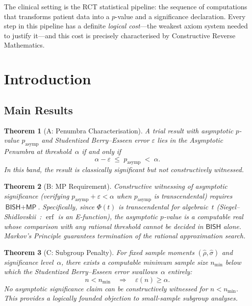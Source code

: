 \documentclass[11pt,a4paper]{article}
\theoremstyle{plain}
\newtheorem{theorem}{Theorem}[section]
\theoremstyle{definition}
\newcommand{\BISH}{\textsf{BISH}}
\newcommand{\MP}{\textsf{MP}}
\renewcommand{\Phi}{\varPhi}
\begin{document}
The clinical setting is the RCT statistical pipeline: the sequence of computations that transforms patient data into a $p$-value and a significance declaration.  Every step in this pipeline has a definite \emph{logical cost}---the weakest axiom system needed to justify it---and this cost is precisely characterised by Constructive Reverse Mathematics.

\section{Introduction}\label{sec:intro}

\subsection{Main Results}

\begin{theorem}[A: Penumbra Characterisation]\label{thm:A}
A trial result with asymptotic $p$-value $p_{\mathrm{asymp}}$ and Studentized Berry--Esseen error $\varepsilon$ lies in the \emph{Asymptotic Penumbra} at threshold~$\alpha$ if and only if
\[
  \alpha - \varepsilon \;\leq\; p_{\mathrm{asymp}} \;<\; \alpha.
\]
In this band, the result is classically significant but not constructively witnessed.
\end{theorem}

\begin{theorem}[B: MP Requirement]\label{thm:B}
Constructive witnessing of asymptotic significance (verifying $p_{\mathrm{asymp}} + \varepsilon < \alpha$ when $p_{\mathrm{asymp}}$ is transcendental) requires $\BISH + \MP$.  Specifically, since $\Phi(t)$ is transcendental for algebraic~$t$ (Siegel--Shidlovskii~\cite{siegel1929,shidlovskii1989}: $\operatorname{erf}$ is an E-function), the asymptotic $p$-value is a computable real whose comparison with any rational threshold cannot be decided in $\BISH$ alone.  Markov's Principle guarantees termination of the rational approximation search.
\end{theorem}

\begin{theorem}[C: Subgroup Penalty]\label{thm:C}
For fixed sample moments $(\hat\rho, \hat\sigma)$ and significance level~$\alpha$, there exists a computable minimum sample size $n_{\min}$ below which the Studentized Berry--Esseen error swallows~$\alpha$ entirely:
\[
  n < n_{\min} \quad\Longrightarrow\quad \varepsilon(n) \geq \alpha.
\]
No asymptotic significance claim can be constructively witnessed for $n < n_{\min}$.  This provides a logically founded objection to small-sample subgroup analyses.
\end{theorem}
\end{document}
